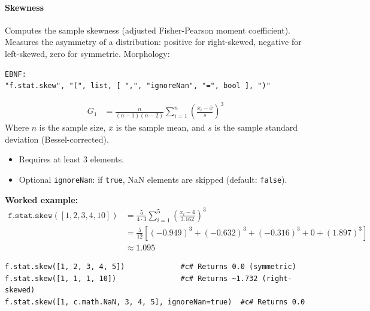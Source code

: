 \paragraph{Skewness}
Computes the sample skewness (adjusted Fisher-Pearson moment coefficient). Measures the asymmetry of a distribution: positive for right-skewed, negative for left-skewed, zero for symmetric.
Morphology:
\begin{verbatim}
EBNF:
"f.stat.skew", "(", list, [ ",", "ignoreNan", "=", bool ], ")"
\end{verbatim}
\begin{align*}
G_1 &= \frac{n}{(n-1)(n-2)} \sum_{i=1}^{n} \left( \frac{x_i - \bar{x}}{s} \right)^3
\end{align*}
Where $n$ is the sample size, $\bar{x}$ is the sample mean, and $s$ is the sample standard deviation (Bessel-corrected).
\begin{itemize}
\item Requires at least 3 elements.
\item Optional \texttt{ignoreNan}: if \texttt{true}, NaN elements are skipped (default: \texttt{false}).
\end{itemize}

\textbf{Worked example:}
\begin{align*}
\texttt{f.stat.skew}([1, 2, 3, 4, 10]) &= \frac{5}{4 \cdot 3} \sum_{i=1}^{5} \left( \frac{x_i - 4}{3.162} \right)^3 \\
&= \frac{5}{12} \left[ (-0.949)^3 + (-0.632)^3 + (-0.316)^3 + 0 + (1.897)^3 \right] \\
&\approx 1.095
\end{align*}

\begin{verbatim}
f.stat.skew([1, 2, 3, 4, 5])             #c# Returns 0.0 (symmetric)
f.stat.skew([1, 1, 1, 10])               #c# Returns ~1.732 (right-skewed)
f.stat.skew([1, c.math.NaN, 3, 4, 5], ignoreNan=true)  #c# Returns 0.0
\end{verbatim}

